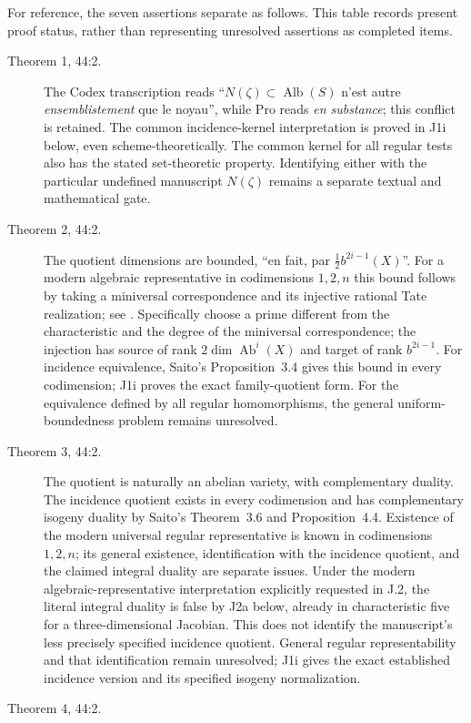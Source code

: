 For reference, the seven assertions separate as follows.  This table
records present proof status, rather than representing unresolved
assertions as completed items.
\begin{description}
\item[Theorem 1, 44:2.]
{\raggedright The Codex transcription reads ``$N(\zeta)\subset\operatorname{Alb}(S)$
n'est autre \emph{ensemblistement} que le noyau'', while Pro reads
\emph{en substance}; this conflict is retained. The common
incidence-kernel interpretation is proved in J1i below, even
scheme-theoretically. The common kernel for all regular tests also
has the stated set-theoretic property. Identifying either with the
particular undefined manuscript $N(\zeta)$ remains a separate
textual and mathematical gate.\par}
\item[Theorem 2, 44:2.]
The quotient dimensions are bounded, ``en fait, par
$\frac12b^{2i-1}(X)$''.  For a modern algebraic representative in
codimensions $1,2,n$ this bound follows by taking a miniversal
correspondence and its injective rational Tate realization; see
\cite[Proposition 8.2, p.~31]{DGJ_ACMVFunctor}.  Specifically choose
a prime different from the characteristic and the degree of the
miniversal correspondence; the injection has source of rank
$2\dim\operatorname{Ab}^i(X)$ and target of rank $b^{2i-1}$.
For incidence equivalence, Saito's Proposition~3.4 gives this bound
in every codimension; J1i proves the exact family-quotient form.
For the equivalence defined by all regular homomorphisms, the
general uniform-boundedness problem remains unresolved.
\item[Theorem 3, 44:2.]
The quotient is naturally an abelian variety, with complementary
duality.  The incidence quotient exists in every codimension and has
complementary isogeny duality by Saito's Theorem~3.6 and
Proposition~4.4. Existence of the modern universal regular
representative is known in codimensions $1,2,n$; its general
existence, identification with the incidence quotient, and the
claimed integral duality are separate issues.  Under the modern
algebraic-representative interpretation explicitly requested in
J.2, the literal integral duality is false by J2a below, already
in characteristic five for a three-dimensional Jacobian.  This
does not identify the manuscript's less precisely specified
incidence quotient.  General regular representability and that identification remain
unresolved; J1i gives the exact established incidence version and
its specified isogeny normalization.
\item[Theorem 4, 44:2.]

\end{description}
